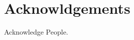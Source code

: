\chapter*{Acknowldgements}


Acknowledge People.

\vspace*{0.4in}

\noindent \hfill \textbf{\authorname}